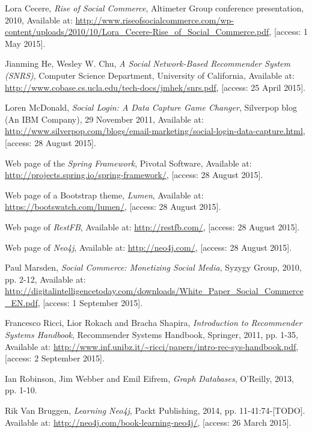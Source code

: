 \documentclass[12pt]{report}
\begin{document}
\begin{thebibliography}{99}

Lora Cecere, \textit{Rise of Social Commerce}, Altimeter Group conference presentation, 2010, Available at: \url{http://www.riseofsocialcommerce.com/wp-content/uploads/2010/10/Lora_Cecere-Rise_of_Social_Commerce.pdf}, [access: 1 May 2015].

Jianming He, Wesley W. Chu, \textit{A Social Network-Based Recommender System (SNRS)}, Computer Science Department, University of California, Available at: \url{http://www.cobase.cs.ucla.edu/tech-docs/jmhek/snrs.pdf}, [access: 25 April 2015].

Loren McDonald, \textit{Social Login: A Data Capture Game Changer}, Silverpop blog (An IBM Company), 29 November 2011, Available at: \url{http://www.silverpop.com/blogs/email-marketing/social-login-data-capture.html}, [access: 28 August 2015].

Web page of the \textit{Spring Framework}, Pivotal Software, Available at: \url{http://projects.spring.io/spring-framework/}, [access: 28 August 2015].

Web page of a Bootstrap theme, \textit{Lumen}, Available at: \url{https://bootswatch.com/lumen/}, [access: 28 August 2015].

Web page of \textit{RestFB}, Available at: \url{http://restfb.com/}, [access: 28 August 2015].

Web page of \textit{Neo4j}, Available at: \url{http://neo4j.com/}, [access: 28 August 2015].

Paul Marsden, \textit{Social Commerce: Monetizing Social Media}, Syzygy Group, 2010, pp. 2-12, Available at: \url{http://digitalintelligencetoday.com/downloads/White_Paper_Social_Commerce_EN.pdf}, [access: 1 September 2015].

Francesco Ricci, Lior Rokach and Bracha Shapira, \textit{Introduction to Recommender Systems Handbook}, Recommender Systems Handbook, Springer, 2011, pp. 1-35, Available at: \url{http://www.inf.unibz.it/~ricci/papers/intro-rec-sys-handbook.pdf}, [access: 2 September 2015].

Ian Robinson, Jim Webber and Emil Eifrem, \textit{Graph Databases}, O'Reilly, 2013, pp. 1-10.

Rik Van Bruggen, \textit{Learning Neo4j}, Packt Publishing, 2014, pp. 11-41:74-[TODO]. Available at: \url{http://neo4j.com/book-learning-neo4j/}, [access: 26 March 2015].


\end{thebibliography}
\end{document}

